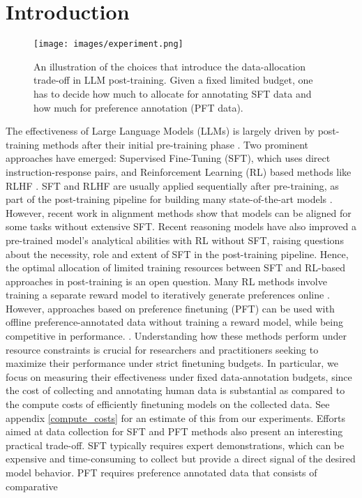 \section{Introduction}

\begin{figure}
    \centering
    \texttt{[image: images/experiment.png]}
    \caption{An illustration of the choices that introduce the data-allocation trade-off in LLM post-training. Given a fixed limited budget, one has to decide how much to allocate for annotating SFT data and how much for preference annotation (PFT data).}
    \label{fig:experiment_setup}
\end{figure}


The effectiveness of Large Language Models (LLMs) is largely driven by post-training methods after their initial pre-training phase \citep{achiam2023gpt, team2023gemini, chung2024scaling}. Two prominent approaches have emerged: Supervised Fine-Tuning (SFT), which uses direct instruction-response pairs, and Reinforcement Learning (RL) based methods like RLHF \citep{christiano2017deep, wei2022finetunedlanguagemodelszeroshot, bai2022training, bai2022constitutional}. SFT and RLHF are usually applied sequentially after pre-training, as part of the post-training pipeline for building many state-of-the-art models \cite{dubey2024llama, lambert2025tulu3pushingfrontiers}. However, recent work in alignment methods \citep{liu2024understandingreferencepoliciesdirect, ethayarajh2024ktomodelalignmentprospect} show that models can be aligned for some tasks without extensive SFT. Recent reasoning models  \citep{guo2025deepseek} have also improved a pre-trained model's analytical abilities with RL without SFT, raising questions about the necessity, role and extent of SFT in the post-training pipeline. Hence, the optimal allocation of limited training resources between SFT and RL-based approaches in post-training is an open question. Many RL methods involve training a separate reward model to iteratively generate preferences online \citep{christiano2017deep, christiano2023deepreinforcementlearninghuman}. However, approaches based on preference finetuning (PFT) \citep{rafailov2024direct, ethayarajh2024kto} can be used with offline preference-annotated data without training a reward model, while being competitive in performance. \citep{lambert2025tulu3pushingfrontiers, allal2025smollm2}. Understanding how these methods perform under resource constraints is crucial for researchers and practitioners seeking to maximize their performance under strict finetuning budgets. In particular, we focus on measuring their effectiveness under fixed data-annotation budgets, since the cost of collecting and annotating human data is substantial as compared to the compute costs of efficiently finetuning models on the collected data. See appendix \ref{compute_costs} for an estimate of this from our experiments. Efforts aimed at data collection for SFT and PFT methods also present an interesting practical trade-off. SFT typically requires expert demonstrations, which can be expensive and time-consuming to collect but provide a direct signal of the desired model behavior. PFT requires preference annotated data that consists of comparative 